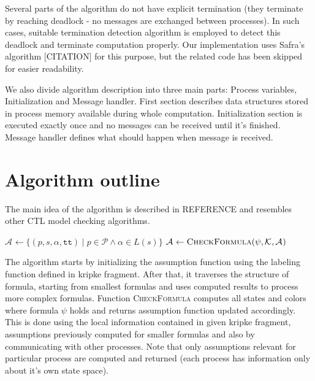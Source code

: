 \documentclass[12pt,oneside,draft]{fithesis2}
\newcommand{\as}[1][]{\ensuremath{\mathcal{A}_{#1}}}
\newcommand{\method}[1]{\textnormal{\textsc{#1}}}
\newcommand{\true}{\ensuremath{\texttt{tt}}}
\newcommand{\ks}[1][]{\ensuremath{\mathcal{K}_{#1}}}
\newcommand{\fullks}{\ensuremath{ \ks = (id, f, \params, S, I, \trans{p}, L) }}
\newcommand{\trans}[1]{\stackrel{#1}{\rightarrow}}
\newcommand{\params}{\mathcal{P}}
\begin{document}
		Several parts of the algorithm do not have explicit termination (they terminate by reaching deadlock - no messages are exchanged between processes). In such cases, suitable termination detection algorithm is employed to detect this deadlock and terminate computation properly. Our implementation uses Safra's algorithm [CITATION] for this purpose, but the related code has been skipped for easier readability.
    	
		We also divide algorithm description into three main parts: Process variables, Initialization and Message handler. First section describes data structures stored in process memory available during whole computation. Initialization section is executed exactly once and no messages can be received until it's finished. Message handler defines what should happen when message is received.  
		
		\section{Algorithm outline}
		
			The main idea of the algorithm is described in REFERENCE and resembles other CTL model checking algorithms.
			
			\begin{algorithmic}[1]
				\Procedure{CheckCTL}{$ \phi, \fullks $}
					\State $ \as \gets \{ (p, s, \alpha, \true) \mid  p \in \params \wedge \alpha \in L(s) \}$ 
							\State $ \as \gets \Call{CheckFormula}{\psi, \ks, \as } $
						\EndFor
					\EndFor
				\EndProcedure			
			\end{algorithmic} 
			
			The algorithm starts by initializing the assumption function using the labeling function defined in kripke fragment. After that, it traverses the structure of formula, starting from smallest formulas and uses computed results to process more complex formulas. Function \method{CheckFormula} computes all states and colors where formula $\psi$ holds and returns assumption function updated accordingly. This is done using the local information contained in given kripke fragment, assumptions previously computed for smaller formulas and also by communicating with other processes. Note that only assumptions relevant for particular process are computed and returned (each process has information only about it's own state space).
    	
\end{document}
